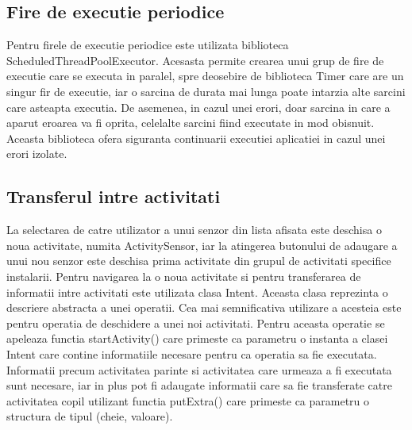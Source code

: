\subsection{Fire de executie periodice}\label{subsec:pi_appandroid_fire_executie}
Pentru firele de executie periodice este utilizata biblioteca ScheduledThreadPoolExecutor. Acesasta permite crearea unui grup de fire de executie care se executa
in paralel, spre deosebire de biblioteca Timer care are un singur fir de executie, iar o sarcina de durata mai lunga poate intarzia alte sarcini care asteapta 
executia. De asemenea, in cazul unei erori, doar sarcina in care a aparut eroarea va fi oprita, celelalte sarcini fiind executate in mod obisnuit. Aceasta 
biblioteca ofera siguranta continuarii executiei aplicatiei in cazul unei erori izolate.

\subsection{Transferul intre activitati}\label{subsec:pi_appandroid_transfer_activitati}
La selectarea de catre utilizator a unui senzor din lista afisata este deschisa o noua activitate, numita ActivitySensor, iar la atingerea butonului de adaugare a unui 
nou senzor este deschisa prima activitate din grupul de activitati specifice instalarii. Pentru navigarea la o noua activitate si pentru transferarea de informatii intre 
activitati este utilizata clasa Intent. Aceasta clasa reprezinta o descriere abstracta a unei operatii. Cea mai semnificativa utilizare a acesteia este pentru operatia de 
deschidere a unei noi activitati. Pentru aceasta operatie se apeleaza functia startActivity() care primeste ca parametru o instanta a clasei Intent care contine informatiile 
necesare pentru ca operatia sa fie executata. Informatii precum activitatea parinte si activitatea care urmeaza a fi executata sunt necesare, iar in plus pot fi adaugate 
informatii care sa fie transferate catre activitatea copil utilizant functia putExtra() care primeste ca parametru o structura de tipul (cheie, valoare).

